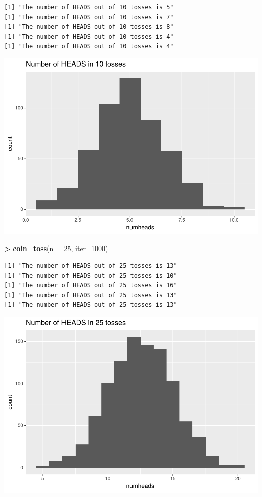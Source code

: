 \documentclass[
]{krantz}
\makeatletter
\newenvironment{Shaded}{\begin{snugshade}}{\end{snugshade}}
\newcommand{\DataTypeTok}[1]{\textcolor[rgb]{0.27,0.27,0.27}{#1}}
\newcommand{\DecValTok}[1]{\textcolor[rgb]{0.06,0.06,0.06}{#1}}
\newcommand{\KeywordTok}[1]{\textcolor[rgb]{0.27,0.27,0.27}{\textbf{#1}}}
\newcommand{\NormalTok}[1]{#1}
\newcommand{\OperatorTok}[1]{\textcolor[rgb]{0.43,0.43,0.43}{\textbf{#1}}}
\newcommand{\StringTok}[1]{\textcolor[rgb]{0.5,0.5,0.5}{#1}}
\newenvironment{kframe}{%
\medskip{}
\setlength{\fboxsep}{.8em}
 \def\at@end@of@kframe{}%
 \ifinner\ifhmode%
  \def\at@end@of@kframe{\end{minipage}}%
  \begin{minipage}{\columnwidth}%
 \fi\fi%
 \def\FrameCommand##1{\hskip\@totalleftmargin \hskip-\fboxsep
 \colorbox{shadecolor}{##1}\hskip-\fboxsep
     \hskip-\linewidth \hskip-\@totalleftmargin \hskip\columnwidth}%
 \MakeFramed {\advance\hsize-\width
   \@totalleftmargin\z@ \linewidth\hsize
   \@setminipage}}%
 {\par\unskip\endMakeFramed%
 \at@end@of@kframe}
\renewenvironment{Shaded}{\begin{kframe}}{\end{kframe}}
\makeatother
\begin{document}
\begin{verbatim}
[1] "The number of HEADS out of 10 tosses is 5"
[1] "The number of HEADS out of 10 tosses is 7"
[1] "The number of HEADS out of 10 tosses is 8"
[1] "The number of HEADS out of 10 tosses is 4"
[1] "The number of HEADS out of 10 tosses is 4"
\end{verbatim}

\includegraphics{bookdown_files/figure-latex/cointoss-1.pdf}

\begin{Shaded}
\begin{Highlighting}[]
\OperatorTok{\textgreater{}}\StringTok{ }\KeywordTok{coin\_toss}\NormalTok{(}\DataTypeTok{n =} \DecValTok{25}\NormalTok{, }\DataTypeTok{iter=}\DecValTok{1000}\NormalTok{)}
\end{Highlighting}
\end{Shaded}

\begin{verbatim}
[1] "The number of HEADS out of 25 tosses is 13"
[1] "The number of HEADS out of 25 tosses is 10"
[1] "The number of HEADS out of 25 tosses is 16"
[1] "The number of HEADS out of 25 tosses is 13"
[1] "The number of HEADS out of 25 tosses is 13"
\end{verbatim}

\includegraphics{bookdown_files/figure-latex/cointoss-2.pdf}
\end{document}
